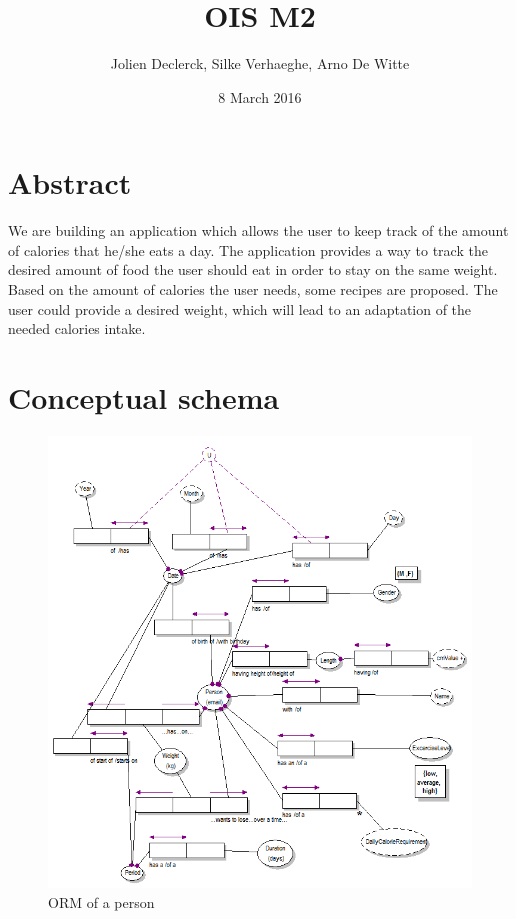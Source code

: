 \documentclass{article}
\title{OIS M2}
\author{Jolien Declerck, Silke Verhaeghe, Arno De Witte}
\date{8 March 2016}
\begin{document}
\maketitle

\section{Abstract}
We are building an application which allows the user to keep track of the amount of calories that he/she eats a day.  The application provides a way to track the desired amount of food the user should eat in order to stay on the same weight. Based on the amount of calories the user needs, some recipes are proposed. The user could provide a desired weight, which will lead to an adaptation of the needed calories intake.

\newpage

\section{Conceptual schema}



  \begin{figure} [h!]
     \includegraphics[width = 1.3\textwidth]{image/Person} 
     \caption{ORM of a person}
     \label{fig:twotier}
  \end{figure}
\end{document}
